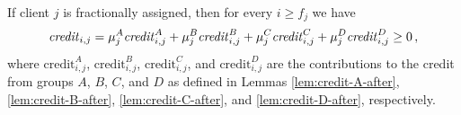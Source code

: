 \begin{lemma}\label{lem:credit-fractional-after}
    If client $j$ is fractionally assigned, then for every $i \geq f_j$ we have
    \begin{equation*}
        \text{\emph{credit}}_{i,j}
        = \mu_j^A \text{\emph{credit}}_{i,j}^A 
        + \mu_j^B \text{\emph{credit}}_{i,j}^B 
        + \mu_j^C \text{\emph{credit}}_{i,j}^C
        + \mu_j^D \text{\emph{credit}}_{i,j}^D \ge 0\,,
    \end{equation*}
    where $\text{credit}_{i,j}^A$, $\text{credit}_{i,j}^B$, $\text{credit}_{i,j}^C$, and $\text{credit}_{i,j}^D$ are the contributions to the credit from groups $A$, $B$, $C$, and $D$ as defined in Lemmas \ref{lem:credit-A-after}, \ref{lem:credit-B-after}, \ref{lem:credit-C-after}, and \ref{lem:credit-D-after}, respectively.
\end{lemma}
